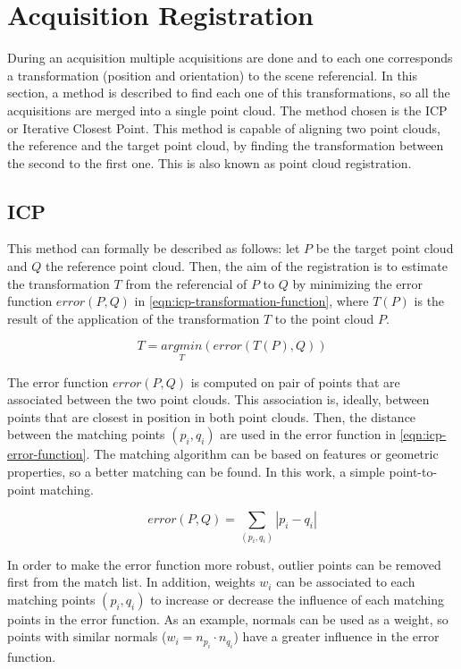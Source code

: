 \section{Acquisition Registration}
\label{section:acquisition-registration}

During an acquisition multiple acquisitions are done and to each one corresponds a transformation (position and orientation) to the scene referencial. In this section, a method is described to find each one of this transformations, so all the acquisitions are merged into a single point cloud. The method chosen is the ICP or Iterative Closest Point. This method is capable of aligning two point clouds, the reference and the target point cloud, by finding the transformation between the second to the first one. This is also known as point cloud registration.

\subsection{ICP}

This method can formally be described as follows: let $P$ be the target point cloud and $Q$ the reference point cloud. Then, the aim of the registration is to estimate the transformation $T$ from the referencial of $P$ to $Q$ by minimizing the error function $error(P, Q)$ in \cref{eqn:icp-transformation-function}, where $T(P)$ is the result of the application of the transformation $T$ to the point cloud $P$.

\begin{equation}
\label{eqn:icp-transformation-function}
    T = \underset{T}{argmin}(error(T(P), Q))
\end{equation}

The error function $error(P, Q)$ is computed on pair of points that are associated between the two point clouds. This association is, ideally, between points that are closest in position in both point clouds. Then, the distance between the matching points $(p_i, q_i)$ are used in the error function in \cref{eqn:icp-error-function}. The matching algorithm can be based on features or geometric properties, so a better matching can be found. In this work, a simple point-to-point matching.

\begin{equation}
\label{eqn:icp-error-function}
    error(P, Q) = \sum_{(p_i, q_i)}{|p_i - q_i|}
\end{equation}

In order to make the error function more robust, outlier points can be removed first from the match list. In addition, weights $w_i$ can be associated to each matching points $(p_i, q_i)$ to increase or decrease the influence of each matching points in the error function. As an example, normals can be used as a weight, so points with similar normals ($w_i = n_{p_i} \cdot n_{q_i}$) have a greater influence in the error function. 

